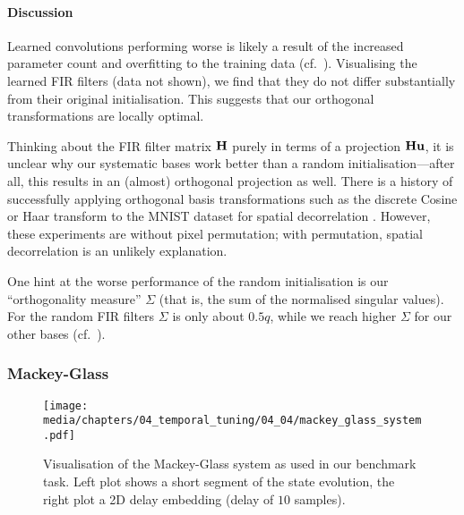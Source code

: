 \paragraph{Discussion}
Learned convolutions performing worse is likely a result of the increased parameter count and overfitting to the training data (cf.~).
Visualising the learned FIR filters (data not shown), we find that they do not differ substantially from their original initialisation.
This suggests that our orthogonal transformations are locally optimal.

Thinking about the FIR filter matrix $\mathbf{H}$ purely in terms of a projection $\mathbf{H} \mathbf{u}$, it is unclear why our systematic bases work better than a random initialisation---after all, this results in an (almost) orthogonal projection as well.
There is a history of successfully applying orthogonal basis transformations such as the discrete Cosine or Haar transform to the MNIST dataset for spatial decorrelation \citep{baldominos2019survey}.
However, these experiments are without pixel permutation; with permutation, spatial decorrelation is an unlikely explanation.

One hint at the worse performance of the random initialisation is our \enquote{orthogonality measure} $\Sigma$ (that is, the sum of the normalised singular values).
For the random FIR filters $\Sigma$ is only about $0.5q$, while we reach higher $\Sigma$ for our other bases (cf.~).


\subsubsection{Mackey-Glass}

\begin{figure}
	\texttt{[image: media/chapters/04\_temporal\_tuning/04\_04/mackey\_glass\_system.pdf]}
	\caption[Visualisation of the Mackey-Glass system]{Visualisation of the Mackey-Glass system as used in our benchmark task.
	Left plot shows a short segment of the state evolution, the right plot a 2D delay embedding (delay of $10$ samples).
	}
	\label{fig:mackey_glass_system}
\end{figure}

